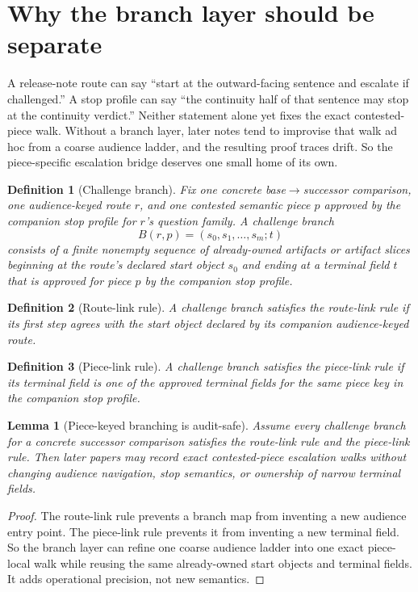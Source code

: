 \documentclass[11pt]{article}
\newtheorem{definition}{Definition}
\newtheorem{lemma}{Lemma}
\begin{document}
\section{Why the branch layer should be separate}
A release-note route can say ``start at the outward-facing sentence and escalate if challenged.''
A stop profile can say ``the continuity half of that sentence may stop at the continuity verdict.''
Neither statement alone yet fixes the exact contested-piece walk.
Without a branch layer, later notes tend to improvise that walk ad hoc from a coarse audience ladder, and the resulting proof traces drift.
So the piece-specific escalation bridge deserves one small home of its own.

\begin{definition}[Challenge branch]
Fix one concrete base$\to$successor comparison, one audience-keyed route $r$, and one contested semantic piece $p$ approved by the companion stop profile for $r$'s question family.
A \emph{challenge branch}
\[
B(r,p)=(s_0,s_1,\dots,s_m; t)
\]
consists of a finite nonempty sequence of already-owned artifacts or artifact slices beginning at the route's declared start object $s_0$ and ending at a terminal field $t$ that is approved for piece $p$ by the companion stop profile.
\end{definition}

\begin{definition}[Route-link rule]
A challenge branch satisfies the \emph{route-link rule} if its first step agrees with the start object declared by its companion audience-keyed route.
\end{definition}

\begin{definition}[Piece-link rule]
A challenge branch satisfies the \emph{piece-link rule} if its terminal field is one of the approved terminal fields for the same piece key in the companion stop profile.
\end{definition}

\begin{lemma}[Piece-keyed branching is audit-safe]
Assume every challenge branch for a concrete successor comparison satisfies the route-link rule and the piece-link rule.
Then later papers may record exact contested-piece escalation walks without changing audience navigation, stop semantics, or ownership of narrow terminal fields.
\end{lemma}

\begin{proof}
The route-link rule prevents a branch map from inventing a new audience entry point.
The piece-link rule prevents it from inventing a new terminal field.
So the branch layer can refine one coarse audience ladder into one exact piece-local walk while reusing the same already-owned start objects and terminal fields.
It adds operational precision, not new semantics.
\end{proof}
\end{document}
